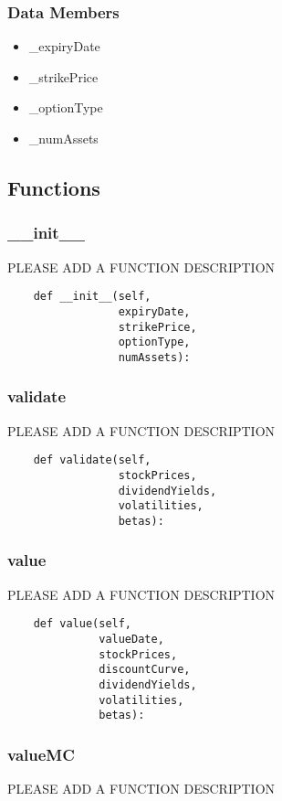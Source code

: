 \documentclass[twoside,11pt]{book}
\begin{document}
\subsubsection*{Data Members}
\begin{itemize}
\item{\_expiryDate}
\item{\_strikePrice}
\item{\_optionType}
\item{\_numAssets}
\end{itemize}

\subsection*{Functions}

\subsubsection*{{\bf \_\_init\_\_}}
PLEASE ADD A FUNCTION DESCRIPTION

\begin{lstlisting}
    def __init__(self,
                 expiryDate,
                 strikePrice,
                 optionType,
                 numAssets):
\end{lstlisting}

\subsubsection*{{\bf validate}}
PLEASE ADD A FUNCTION DESCRIPTION

\begin{lstlisting}
    def validate(self,
                 stockPrices,
                 dividendYields,
                 volatilities,
                 betas):
\end{lstlisting}

\subsubsection*{{\bf value}}
PLEASE ADD A FUNCTION DESCRIPTION

\begin{lstlisting}
    def value(self,
              valueDate,
              stockPrices,
              discountCurve,
              dividendYields,
              volatilities,
              betas):
\end{lstlisting}

\subsubsection*{{\bf valueMC}}
PLEASE ADD A FUNCTION DESCRIPTION
\end{document}
